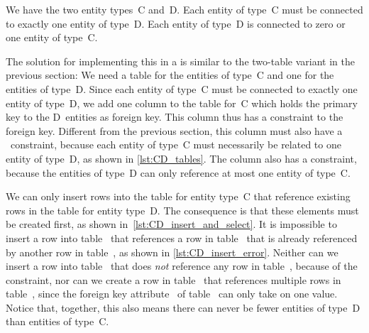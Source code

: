 %
%
%
%
%
%
%
%
We have the two entity types~C and~D.
Each entity of type~C must be connected to exactly one entity of type~D.
Each entity of type~D is connected to zero or one entity of type~C.

The solution for implementing this in a  is similar to the two-table variant in the previous section:
We need a table for the entities of type~C and one for the entities of type~D.
Since each entity of type~C must be connected to exactly one entity of type~D, we add one column to the table for~C which holds the primary key to the D~entities as foreign key.
This column thus has a  constraint to the foreign key.
Different from the previous section, this column must also have a ~constraint, because each entity of type~C must necessarily be related to one entity of type~D, as shown in \cref{lst:CD_tables}.
The column also has a  constraint, because the entities of type~D can only reference at most one entity of type~C.

We can only insert rows into the table for entity type~C that reference existing rows in the table for entity type~D.
The consequence is that these elements must be created first, as shown in~\cref{lst:CD_insert_and_select}.
It is impossible to insert a row into table~ that references a row in table~ that is already referenced by another row in table~, as shown in \cref{lst:CD_insert_error}.
Neither can we insert a row into table~ that does \emph{not} reference any row in table~, because of the  constraint, nor can we create a row in table~ that references multiple rows in table~, since the foreign key attribute~ of table~ can only take on one value.
Notice that, together, this also means there can never be fewer entities of type~D than entities of type~C.%
\FloatBarrier%
\endhsection%
%
